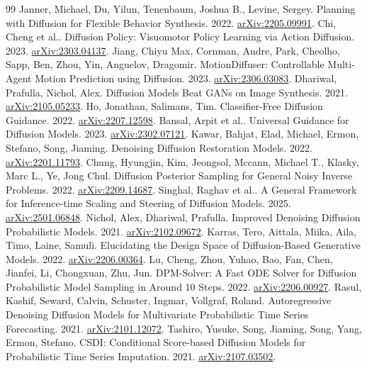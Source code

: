 \begin{thebibliography}{99}
 Janner, Michael, Du, Yilun, Tenenbaum, Joshua B., Levine, Sergey. Planning with Diffusion for Flexible Behavior Synthesis. 2022. \href{https://arxiv.org/abs/2205.09991}{arXiv:2205.09991}.
 Chi, Cheng et al.. Diffusion Policy: Visuomotor Policy Learning via Action Diffusion. 2023. \href{https://arxiv.org/abs/2303.04137}{arXiv:2303.04137}.
 Jiang, Chiyu Max, Cornman, Andre, Park, Cheolho, Sapp, Ben, Zhou, Yin, Anguelov, Dragomir. MotionDiffuser: Controllable Multi-Agent Motion Prediction using Diffusion. 2023. \href{https://arxiv.org/abs/2306.03083}{arXiv:2306.03083}.
 Dhariwal, Prafulla, Nichol, Alex. Diffusion Models Beat GANs on Image Synthesis. 2021. \href{https://arxiv.org/abs/2105.05233}{arXiv:2105.05233}.
 Ho, Jonathan, Salimans, Tim. Classifier-Free Diffusion Guidance. 2022. \href{https://arxiv.org/abs/2207.12598}{arXiv:2207.12598}.
 Bansal, Arpit et al.. Universal Guidance for Diffusion Models. 2023. \href{https://arxiv.org/abs/2302.07121}{arXiv:2302.07121}.
 Kawar, Bahjat, Elad, Michael, Ermon, Stefano, Song, Jiaming. Denoising Diffusion Restoration Models. 2022. \href{https://arxiv.org/abs/2201.11793}{arXiv:2201.11793}.
 Chung, Hyungjin, Kim, Jeongsol, Mccann, Michael T., Klasky, Marc L., Ye, Jong Chul. Diffusion Posterior Sampling for General Noisy Inverse Problems. 2022. \href{https://arxiv.org/abs/2209.14687}{arXiv:2209.14687}.
 Singhal, Raghav et al.. A General Framework for Inference-time Scaling and Steering of Diffusion Models. 2025. \href{https://arxiv.org/abs/2501.06848}{arXiv:2501.06848}.
 Nichol, Alex, Dhariwal, Prafulla. Improved Denoising Diffusion Probabilistic Models. 2021. \href{https://arxiv.org/abs/2102.09672}{arXiv:2102.09672}.
 Karras, Tero, Aittala, Miika, Aila, Timo, Laine, Samuli. Elucidating the Design Space of Diffusion-Based Generative Models. 2022. \href{https://arxiv.org/abs/2206.00364}{arXiv:2206.00364}.
 Lu, Cheng, Zhou, Yuhao, Bao, Fan, Chen, Jianfei, Li, Chongxuan, Zhu, Jun. DPM-Solver: A Fast ODE Solver for Diffusion Probabilistic Model Sampling in Around 10 Steps. 2022. \href{https://arxiv.org/abs/2206.00927}{arXiv:2206.00927}.
 Rasul, Kashif, Seward, Calvin, Schuster, Ingmar, Vollgraf, Roland. Autoregressive Denoising Diffusion Models for Multivariate Probabilistic Time Series Forecasting. 2021. \href{https://arxiv.org/abs/2101.12072}{arXiv:2101.12072}.
 Tashiro, Yusuke, Song, Jiaming, Song, Yang, Ermon, Stefano. CSDI: Conditional Score-based Diffusion Models for Probabilistic Time Series Imputation. 2021. \href{https://arxiv.org/abs/2107.03502}{arXiv:2107.03502}.

\end{thebibliography}
